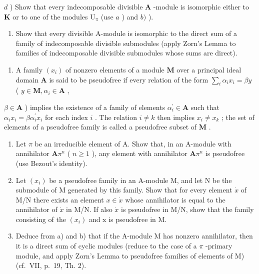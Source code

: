 \(d\) ) Show that every indecomposable divisible \(\mathbf{A}\) -module is isomorphic either to \(\mathbf{K}\) or to one of the modules \(\mathrm{U}_{\pi}\) (use \(a\) ) and \(b)\) ).

\begin{enumerate}
\def\labelenumi{\alph{enumi})}
\setcounter{enumi}{4}
\tightlist
\item
  Show that every divisible A-module is isomorphic to the direct sum of a family of indecomposable divisible submodules (apply Zorn's Lemma to families of indecomposable divisible submodules whose sums are direct).
\end{enumerate}

\begin{enumerate}
\def\labelenumi{\arabic{enumi})}
\setcounter{enumi}{3}
\tightlist
\item
  A family \((x_{i})\) of nonzero elements of a module \(\mathbf{M}\) over a principal ideal domain \(\mathbf{A}\) is said to be pseudofree if every relation of the form \(\sum_{i} \alpha_{i} x_{i} = \beta y\) ( \(y \in \mathbf{M}, \alpha_{i} \in \mathbf{A}\) ,
\end{enumerate}

\(\beta \in \mathbf{A}\) ) implies the existence of a family of elements \(\alpha_{i}^{\prime} \in \mathbf{A}\) such that \(\alpha_{i}x_{i} = \beta \alpha_{i}^{\prime} x_{i}\) for each index \(i\) . The relation \(i \neq k\) then implies \(x_{i} \neq x_{k}\) ; the set of elements of a pseudofree family is called a pseudofree subset of \(\mathbf{M}\) .

\begin{enumerate}
\def\labelenumi{\alph{enumi})}
\item
  Let \(\pi\) be an irreducible element of A. Show that, in an A-module with annihilator \(\mathbf{A}\pi^n\) ( \(n \geqslant 1\) ), any element with annihilator \(\mathbf{A}\pi^n\) is pseudofree (use Bezout's identity).
\item
  Let \((x_{i})\) be a pseudofree family in an A-module M, and let N be the submodule of M generated by this family. Show that for every element \(\dot{x}\) of M/N there exists an element \(x \in \dot{x}\) whose annihilator is equal to the annihilator of \(\dot{x}\) in M/N. If also \(\dot{x}\) is pseudofree in M/N, show that the family consisting of the \((x_{i})\) and x is pseudofree in M.
\item
  Deduce from a) and b) that if the A-module M has nonzero annihilator, then it is a direct sum of cyclic modules (reduce to the case of a \(\pi\) -primary module, and apply Zorn's Lemma to pseudofree families of elements of M) (cf.~VII, p.~19, Th. 2).
\end{enumerate}

